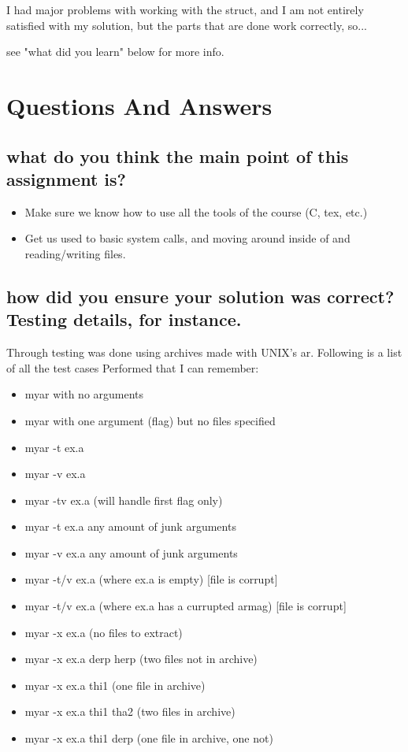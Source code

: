 \documentclass[letterpaper,10pt,titlepage]{article}
\begin{document}
I had major problems with working with the struct, and I am not entirely satisfied with my solution, but the parts that are done work correctly, so...

see "what did you learn" below for more info.

\section{Questions And Answers}

\subsection{what do you think the main point of this assignment is?}

\begin{itemize}
\item Make sure we know how to use all the tools of the course (C, tex, etc.)
\item Get us used to basic system calls, and moving around inside of and reading/writing files.
\end{itemize}

\subsection{how did you ensure your solution was correct? Testing details, for instance.}

Through testing was done using archives made with UNIX's ar.  Following is a list of all the test cases Performed that I can remember:

\begin{itemize}
\item myar with no arguments
\item myar with one argument (flag) but no files specified
\item myar -t ex.a
\item myar -v ex.a
\item myar -tv ex.a   (will handle first flag only)
\item myar -t ex.a any amount of junk arguments
\item myar -v ex.a any amount of junk arguments
\item myar -t/v ex.a (where ex.a is empty) [file is corrupt]
\item myar -t/v ex.a (where ex.a has a currupted armag) [file is corrupt]
\item myar -x ex.a (no files to extract)
\item myar -x ex.a derp herp (two files not in archive)
\item myar -x ex.a thi1 (one file in archive)
\item myar -x ex.a thi1 tha2 (two files in archive)
\item myar -x ex.a thi1 derp (one file in archive, one not)
\end{itemize}
\end{document}
